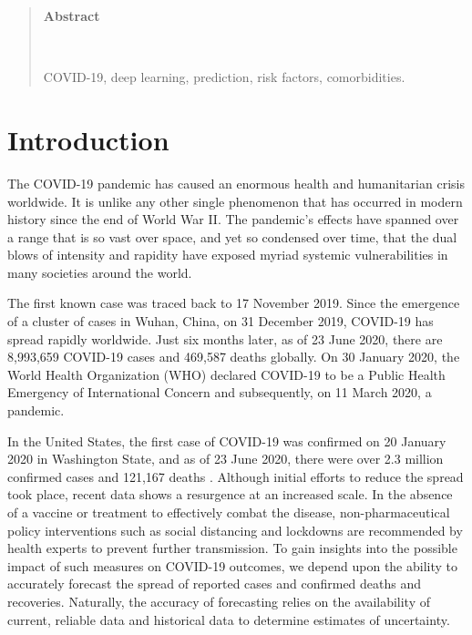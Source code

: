 \documentclass[12pt]{article}
\theoremstyle{definition}
\renewcommand{\_}{%
    \textunderscore\hspace{0pt}%
}
\begin{document}
\begin{quotation}
\centerline{\bfseries{\fontsize{14pt}{1em}\selectfont Abstract}}\par
\setlength{\parindent}{3.22cm}
{\fontsize{12pt}{1.07em}\selectfont~~\ABSTRACT}

\vspace{12pt}
COVID-19, deep learning, prediction, risk factors, comorbidities.
\par
\end{quotation}\par

\def\thefigure{\arabic{figure}}
\def\thetable{\arabic{table}}

\renewcommand{\theequation}{\thesection.\arabic{equation}}

\fontsize{12}{1.07em}\selectfont

\setcounter{section}{0} %
\setcounter{equation}{0} %


\section{Introduction}

The COVID-19 pandemic has caused an enormous health and humanitarian crisis worldwide. It is unlike any other single phenomenon that has occurred in modern history since the end of World War II. 
The pandemic’s effects have spanned over a range that is so vast over space, and yet so condensed over time, that the dual blows of intensity and rapidity have exposed myriad systemic vulnerabilities in many societies around the world. 

The first known case was traced back to  17  November  2019. Since the emergence of a cluster of cases in Wuhan, China, on 31 December 2019, COVID-19 has spread rapidly worldwide. Just six months later, as of 23 June 2020, there are 8,993,659 COVID-19 cases and 469,587 deaths globally. On 30 January 2020, the World Health Organization (WHO) \cite{www-who} declared COVID-19 to be a Public Health Emergency of International Concern and subsequently, on 11 March 2020, a pandemic.

In the United States, the first case of COVID-19 was confirmed on 20 January 2020 in Washington State, and as of 23 June 2020, there were over 2.3 million confirmed cases and 121,167 deaths \cite{www-nyt-map}. 
Although initial efforts to reduce the spread took place, recent data shows a resurgence at an increased scale. In the absence of a vaccine or treatment to effectively combat the disease, non-pharmaceutical policy interventions such as social distancing and lockdowns are recommended by health experts to prevent further transmission. To gain insights into the possible impact of such measures on COVID-19 outcomes, we depend upon the ability to accurately forecast the spread of reported cases and confirmed deaths and recoveries. Naturally, the accuracy of forecasting relies on the availability of current, reliable data and historical data to determine estimates of uncertainty.
\end{document}
